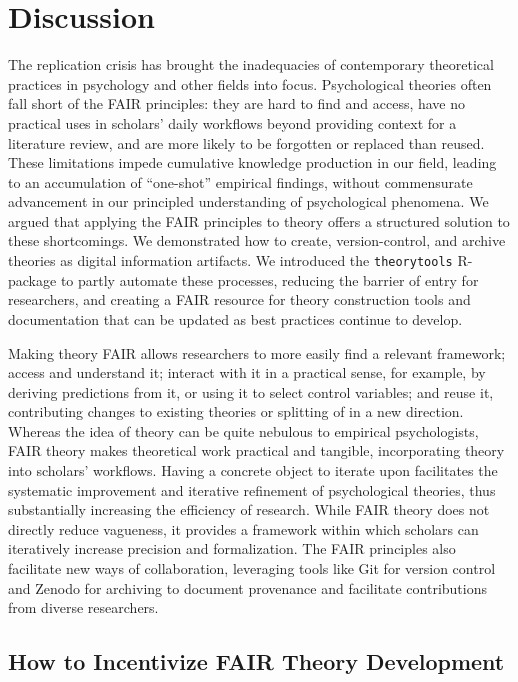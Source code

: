 \documentclass[
  man, noextraspace,floatsintext]{apa7}
\begin{document}
\section{Discussion}\label{discussion}

The replication crisis has brought the inadequacies of contemporary theoretical practices in psychology and other fields into focus.
Psychological theories often fall short of the FAIR principles:
they are hard to find and access, have no practical uses in scholars' daily workflows beyond providing context for a literature review,
and are more likely to be forgotten or replaced than reused.
These limitations impede cumulative knowledge production in our field,
leading to an accumulation of ``one-shot'' empirical findings, without commensurate advancement in our principled understanding of psychological phenomena.
We argued that applying the FAIR principles to theory offers a structured solution to these shortcomings.
We demonstrated how to create, version-control, and archive theories as digital information artifacts.
We introduced the \texttt{theorytools} R-package to partly automate these processes, reducing the barrier of entry for researchers,
and creating a FAIR resource for theory construction tools and documentation that can be updated as best practices continue to develop.

Making theory FAIR allows researchers to more easily find a relevant framework;
access and understand it; interact with it in a practical sense, for example, by deriving predictions from it, or using it to select control variables; and reuse it, contributing changes to existing theories or splitting of in a new direction.
Whereas the idea of theory can be quite nebulous to empirical psychologists,
FAIR theory makes theoretical work practical and tangible, incorporating theory into scholars' workflows.
Having a concrete object to iterate upon facilitates the systematic improvement and iterative refinement of psychological theories, thus substantially increasing the efficiency of research.
While FAIR theory does not directly reduce vagueness,
it provides a framework within which scholars can iteratively increase precision and formalization.
The FAIR principles also facilitate new ways of collaboration,
leveraging tools like Git for version control and Zenodo for archiving to document provenance and facilitate contributions from diverse researchers.

\subsection{How to Incentivize FAIR Theory Development}\label{how-to-incentivize-fair-theory-development}
\end{document}
